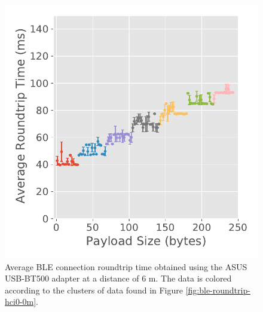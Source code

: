\begin{figure}[H]
    \centering
    \begin{minipage}{0.45\linewidth}
        \centering
        \includegraphics[width=\linewidth]{images/ble-roundtrip-hci0-600cm.pdf}
        \caption[Average \acs{BLE} connection roundtrip time obtained using the ASUS USB-BT500 adapter at a distance of 6 m.]{Average \acs{BLE} connection roundtrip time obtained using the ASUS USB-BT500 adapter at a distance of $6\text{ m}$. The data is colored according to the clusters of data found in Figure \ref{fig:ble-roundtrip-hci0-0m}.}
        \label{fig:ble-roundtrip-hci0-6m}
    \end{minipage}
    \hspace{0.05\linewidth}
    \begin{minipage}{0.45\linewidth}
        \centering

\end{minipage}
\end{figure}

